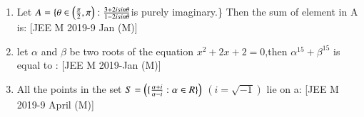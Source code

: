 \documentclass[journal,12pt,twocolumn,article]{IEEEtran}
\theoremstyle{remark}
\begin{document}
\begin{enumerate}[start = 14]
\item Let  $A=\{\theta \in \left(\frac{\pi}{2},\pi\right):\frac{3+2isin\theta}{1-2isin\theta}$is purely imaginary.\} Then the sum of element in A is:
\hfill{[JEE M 2019-9 Jan (M)]}
\begin{enumerate}
\end{enumerate}

\item let $\alpha$ and $\beta$ be two roots of the equation $x^2+2x+2=0$,then $\alpha^{15}+\beta^{15}$ is equal to :                                       
\hfill{[JEE M 2019-Jan (M)]}                       
\begin{enumerate}                                   
\end{enumerate}

\item  All the points in the set $S=\left(\{\frac{\alpha+i}{\alpha-i}:\alpha \in R\}\right)$ $(i=\surd{-1})$ lie on a:
\hfill{[JEE M 2019-9 April (M)]}                    
\begin{enumerate}                                   
\end{enumerate}
\end{enumerate}
\end{document}
